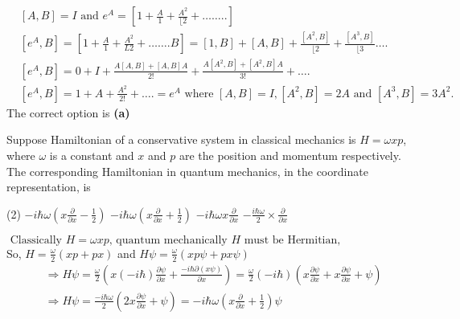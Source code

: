 \begin{enumerate}
\begin{answer}
	\begin{align*}
	&[A, B]=I \text { and } e^{A}=\left[1+\frac{A}{1}+\frac{A^{2}}{\lfloor 2}+\ldots \ldots . .\right]\\
	&{\left[e^{A}, B\right]=\left[1+\frac{A}{1}+\frac{A^{2}}{L 2}+\ldots \ldots . B\right]=[1, B]+[A, B]+\frac{\left[A^{2}, B\right]}{\lfloor 2}+\frac{\left[A^{3}, B\right]}{\lfloor 3} \ldots .} \\
	&{\left[e^{A}, B\right]=0+I+\frac{A[A, B]+[A, B] A}{2 !}+\frac{A\left[A^{2}, B\right]+\left[A^{2}, B\right] A}{3 !}+\ldots .} \\
	&{\left[e^{A}, B\right]=1+A+\frac{A^{2}}{2 !}+\ldots .=e^{A} \text { where }[A, B]=I,\left[A^{2}, B\right]=2 A \text { and }\left[A^{3}, B\right]=3 A^{2} .}
	\end{align*}
	The correct option is \textbf{(a)}
\end{answer}
\begin{minipage}{\textwidth}
	\item Suppose Hamiltonian of a conservative system in classical mechanics is $H=\omega x p$, where $\omega$ is a constant and $x$ and $p$ are the position and momentum respectively. The corresponding Hamiltonian in quantum mechanics, in the coordinate representation, is
\end{minipage}
\begin{tasks}(2)
	\task[\textbf{A.}] $-i \hbar \omega\left(x \frac{\partial}{\partial x}-\frac{1}{2}\right)$
	\task[\textbf{B.}]$-i \hbar \omega\left(x \frac{\partial}{\partial x}+\frac{1}{2}\right)$
	\task[\textbf{C.}] $-i \hbar \omega x \frac{\partial}{\partial x}$
	\task[\textbf{D.}]$-\frac{i \hbar \omega}{2} \times \frac{\partial}{\partial x}$
\end{tasks}
\begin{answer}
	$\text { Classically } H=\omega x p \text {, quantum mechanically } H \text { must be Hermitian, }$\\
	So, $H=\frac{\omega}{2}(x p+p x)$ and $H \psi=\frac{\omega}{2}(x p \psi+p x \psi)$
	\begin{align*}
	&\Rightarrow H \psi=\frac{\omega}{2}\left(x(-i \hbar) \frac{\partial \psi}{\partial x}+\frac{-i \hbar \partial(x \psi)}{\partial x}\right)=\frac{\omega}{2}(-i \hbar)\left(x \frac{\partial \psi}{\partial x}+x \frac{\partial \psi}{\partial x}+\psi\right) \\
	&\Rightarrow H \psi=\frac{-i \hbar \omega}{2}\left(2 x \frac{\partial \psi}{\partial x}+\psi\right)=-i \hbar \omega\left(x \frac{\partial}{\partial x}+\frac{1}{2}\right) \psi

\end{align*}
\end{answer}
\end{enumerate}
